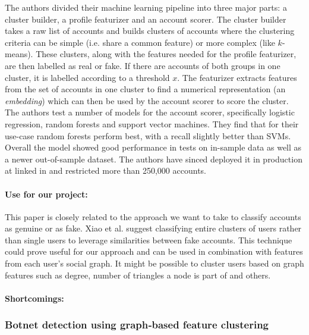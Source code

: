 The authors divided their machine learning pipeline into three major parts: a cluster builder, a profile featurizer and an account scorer. The cluster builder takes a raw list of accounts and builds clusters of accounts where the clustering criteria can be simple (i.e. share a common feature) or more complex (like $k$-means). These clusters, along with the features needed for the profile featurizer, are then labelled as real or fake. If there are accounts of both groups in one cluster, it is labelled according to a threshold $x$. The featurizer extracts features from the set of accounts in one cluster to find a numerical representation (an \emph{embedding}) which can then be used by the account scorer to score the cluster. The authors test a number of models for the account scorer, specifically logistic regression, random forests and support vector machines. They find that for their use-case random forests perform best, with a recall slightly better than SVMs. Overall the model showed good performance in tests on in-sample data as well as a newer out-of-sample dataset. The authors have sinced deployed it in production at linked in and restricted more than 250,000 accounts.

\paragraph{Use for our project:}
This paper is closely related to the approach we want to take to classify accounts as genuine or as fake. Xiao et al. suggest classifying entire clusters of users rather than single users to leverage similarities between fake accounts. This technique could prove useful for our approach and can be used in combination with features from each user's social graph. It might be possible to cluster users based on graph features such as degree, number of triangles a node is part of and others.

\paragraph{Shortcomings:}

\subsubsection{Botnet detection using graph‐based feature clustering}

